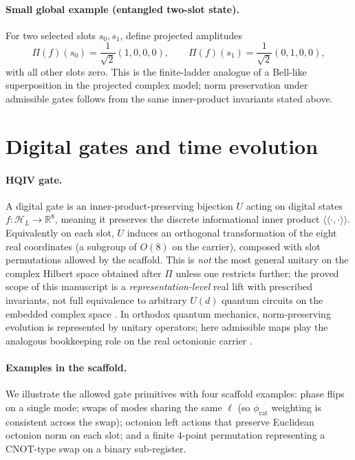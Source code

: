 \documentclass[11pt,a4paper]{article}
\theoremstyle{remark}
\begin{document}
\paragraph{Small global example (entangled two-slot state).}
For two selected slots $s_0,s_1$, define projected amplitudes
\[
  \Pi(f)(s_0)=\frac{1}{\sqrt{2}}(1,0,0,0),\qquad
  \Pi(f)(s_1)=\frac{1}{\sqrt{2}}(0,1,0,0),
\]
with all other slots zero. This is the finite-ladder analogue of a Bell-like superposition in the projected complex model; norm preservation under admissible gates follows from the same inner-product invariants stated above.

\section{Digital gates and time evolution}
\label{sec:gates}

\paragraph{HQIV gate.}
A digital gate is an inner-product-preserving bijection $U$ acting on digital states $f:\mathcal{H}_L\to\mathbb{R}^8$, meaning it preserves the discrete informational inner product $\langle\!\langle\cdot,\cdot\rangle\!\rangle$. Equivalently on each slot, $U$ induces an orthogonal transformation of the eight real coordinates (a subgroup of $O(8)$ on the carrier), composed with slot permutations allowed by the scaffold. This is \emph{not} the most general unitary on the complex Hilbert space obtained after $\Pi$ unless one restricts further; the proved scope of this manuscript is a \emph{representation-level} real lift with prescribed invariants, not full equivalence to arbitrary $U(d)$ quantum circuits on the embedded complex space \cite{vonNeumann1955,dirac1930}. In orthodox quantum mechanics, norm-preserving evolution is represented by unitary operators; here admissible maps play the analogous bookkeeping role on the real octonionic carrier \cite{freedman2019}.

\paragraph{Examples in the scaffold.}
We illustrate the allowed gate primitives with four scaffold examples: phase flips on a single mode; swaps of modes sharing the same $\ell$ (so $\phi_{\mathrm{rat}}$ weighting is consistent across the swap); octonion left actions that preserve Euclidean octonion norm on each slot; and a finite $4$-point permutation representing a CNOT-type swap on a binary sub-register.
\end{document}
